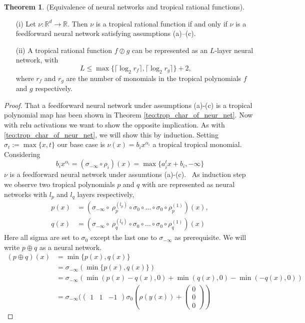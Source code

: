 \documentclass{article}
\theoremstyle{definition}
\newtheorem{theorem}{Theorem}[section]
\begin{document}
\begin{theorem}
(Equivalence of neural networks and tropical
rational functions).
\begin{itemize}
\item[(i)]
Let $\nu : \mathbb{R}^{d} \to \mathbb{R}$. Then $\nu$ is a tropical rational function if and only if $\nu$ is a feedforward neural network satisfying assumptions (a)–(c).
\item[(ii)]
A tropical rational function $f \oslash g$ can be represented as an $L$-layer neural network, with
$$ L \leq \max \{ \lceil \log_2 r_f \rceil, \lceil \log_2 r_g \rceil \} + 2,$$
where $r_f$ and $r_g$ are the number of monomials in the tropical polynomials $f$ and $g$ respectively.
\end{itemize}
\end{theorem}
\begin{proof}
That a feedforward neural network under assumptions (a)-(c) is a tropical polynomial map has been shown in Theorem \ref{teo:trop_char_of_neur_net}. Now with relu activations we want to show the opposite implication. As with \ref{teo:trop_char_of_neur_net}, we will show this by induction. Setting $\sigma_{t} := \max \{ x, t\}$ our base case is $\nu (x) = b_{i} x^{\alpha_{i}}$ a tropical tropical monomial. Considering
$$b_{i}x^{\alpha_{i}} = (\sigma_{- \infty} \circ \rho_{i})(x) = \max \{ a_{i}^{t}x + b_{i}, -\infty \}$$
$\nu$ is a feedforward neural network under assumtions (a)-(c). \
As induction step we observe two tropical polynomials $p$ and $q$ with are represented as neural networks with $l_{p}$ and $l_{q}$ layers respectively,
\begin{align*}
p(x) &= (\sigma_{- \infty} \circ \ \rho_{p}^{(l_{p})} \circ \sigma_{0} \circ \dots \circ \sigma_{0} \circ \rho_{p}^{(1)})(x), \\
q(x) &= (\sigma_{- \infty} \circ \ \rho_{q}^{(l_{q})} \circ \sigma_{0} \circ \dots \circ \sigma_{0} \circ \rho_{q}^{(1)})(x)
\end{align*}
Here all sigma are set to $\sigma_{0}$ except the last one to $\sigma_{- \infty}$ as prerequisite. We will write $p \oplus q$ as a neural network.
\begin{align*}
(p \oplus q)(x) 
&= \min \{ p(x), q(x) \} \\
&= \sigma_{- \infty }( \min \{ p(x), q(x) \} ) \\
&= \sigma_{- \infty }( \min(p(x)-q(x), 0) + \min(q(x), 0) - \min(-q(x), 0)) \\
&= \sigma_{- \infty }(\begin{pmatrix} 1 & 1 & -1 \end{pmatrix} \sigma_{0}(\rho(y(x)) + \begin{pmatrix} 0 \\ 0 \\ 0 \end{pmatrix})

\end{align*}
\end{proof}
\end{document}
